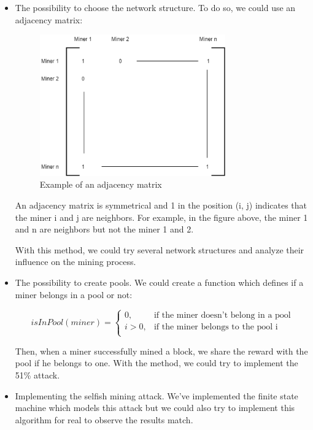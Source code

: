 \begin{itemize}
  \item The possibility to choose the network structure. To do so, we could use an adjacency matrix: \newline

  \begin{figure}[ht]
  \centering
  \includegraphics[width=8cm]{Figures/matrix}
  \caption{Example of an adjacency matrix}
  \end{figure}
  \medskip

  An adjacency matrix is symmetrical and 1 in the position (i, j) indicates that the miner i and j are neighbors. For example, in the figure above, the miner 1 and n are neighbors but not the miner 1 and 2. \newline

  With this method, we could try several network structures and analyze their influence on the mining process.

  \item The possibility to create pools. We could create a function which defines if a miner belongs in a pool or not: \newline

  \[
    isInPool(miner) =
    \begin{cases}
      0, & \text{if the miner doesn't belong in a pool}  \\
      i > 0, & \text{if the miner belongs to the pool i} \\
    \end{cases}
  \]
  \medskip

  Then, when a miner successfully mined a block, we share the reward with the pool if he belongs to one. With the method, we could try to implement the 51\% attack.

  \item Implementing the selfish mining attack. We've implemented the finite state machine which models this attack but we could also try to implement this algorithm for real to observe the results match.


\end{itemize}
